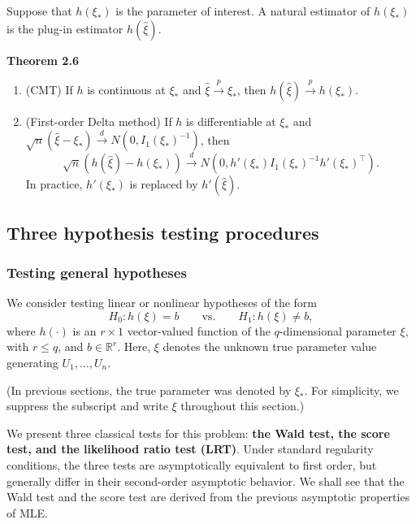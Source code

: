 \documentclass{article}
\theoremstyle{break}
\newcommand{\R}{\ensuremath{\mathbb{R}}}
\begin{document}
Suppose that $h(\xi_*)$ is the parameter of interest. A natural estimator of $h(\xi_*)$ is the plug-in estimator $h(\hat{\xi})$.

\textbf{Theorem 2.6}
\begin{enumerate}
  \item (CMT) If $h$ is continuous at $\xi_*$ and $\hat{\xi} \stackrel{p}{\to} \xi_*$, then $h(\hat{\xi}) \stackrel{p}{\to} h(\xi_*)$.
  \item (First-order Delta method) If $h$ is differentiable at $\xi_*$ and $\sqrt{n}(\hat{\xi} - \xi_*) \stackrel{d}{\to} N(0, I_1(\xi_*)^{-1})$, then 
    \[
    \sqrt{n}(h(\hat{\xi}) - h(\xi_*)) \stackrel{d}{\to} N(0, h'(\xi_*) I_1(\xi_*)^{-1} h'(\xi_*)^\top).
    \]
    In practice, $h'(\xi_*)$ is replaced by $h'(\hat\xi)$.
\end{enumerate}



\subsection{Three hypothesis testing procedures}\label{sec:prelim-glm-three-tests}
\subsubsection{Testing general hypotheses}
We consider testing linear or nonlinear hypotheses of the form
\[
    H_0: h(\xi)=b
    \qquad \text{vs.} \qquad
    H_1: h(\xi)\neq b,
\]
where $h(\cdot)$ is an $r \times 1$ vector-valued function of the $q$-dimensional parameter $\xi$, with $r \leq q$, and $b \in \R^r$. 
Here, $\xi$ denotes the unknown true parameter value generating $U_1,\ldots,U_n$.

(In previous sections, the true parameter was denoted by $\xi_*$. For simplicity, we suppress the subscript and write $\xi$ throughout this section.)

We present three classical tests for this problem: \textbf{the Wald test, the score test, and the likelihood ratio test (LRT)}. Under standard regularity conditions, the three tests are asymptotically equivalent to first order, but generally differ in their second-order asymptotic behavior.
We shall see that the Wald test and the score test are derived from the previous asymptotic properties of MLE.
\end{document}
